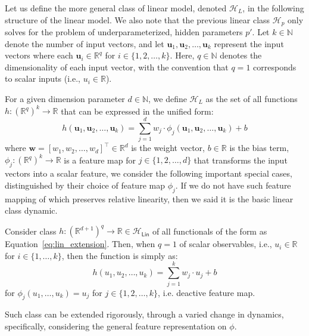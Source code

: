 Let us define the more general class of linear model, denoted $\mathcal{H}_{L}$, in the following structure of the linear model. We also note that the previous linear class $\mathcal{H}_{p}$ only solves for the problem of underparameterized, hidden parameters $p'$. Let $k \in \mathbb{N}$ denote the number of input vectors, and let $\mathbf{u}_1, \mathbf{u}_2, \ldots, \mathbf{u}_k$ represent the input vectors where each $\mathbf{u}_i \in \mathbb{R}^{q}$ for $i \in \{1, 2, \ldots, k\}$. Here, $q \in \mathbb{N}$ denotes the dimensionality of each input vector, with the convention that $q = 1$ corresponds to scalar inputs (i.e., $u_i \in \mathbb{R}$).

For a given dimension parameter $d \in \mathbb{N}$, we define $\mathcal{H}_{L}$ as the set of all functions $h: (\mathbb{R}^{q})^k \to \mathbb{R}$ that can be expressed in the unified form:
\begin{equation}\label{eq:lin_extension}
        h(\mathbf{u}_1, \mathbf{u}_2, \ldots, \mathbf{u}_k) = \sum_{j=1}^{d} w_j \cdot \phi_j(\mathbf{u}_1, \mathbf{u}_2, \ldots, \mathbf{u}_k) + b
    \end{equation}
where $\mathbf{w} = [w_1, w_2, \ldots, w_d]^{\top} \in \mathbb{R}^{d}$ is the weight vector, $b \in \mathbb{R}$ is the bias term, $\phi_j: (\mathbb{R}^{q})^k \to \mathbb{R}$ is a feature map for $j \in \{1, 2, \ldots, d\}$ that transforms the input vectors into a scalar feature, we consider the following important special cases, distinguished by their choice of feature map $\phi_j$. If we do not have such feature mapping of which preserves relative linearity, then we said it is the basic linear class dynamic. 

\begin{definition}[Linear class, $q=1$]
    Consider class $h: (\mathbb{R}^{d+1})^{q}\to \mathbb{R}\in\mathcal{H}_{\mathsf{Lin}}$ of all functionals of the form as Equation~\ref{eq:lin_extension}. Then, when $q=1$ of scalar observables, i.e., $u_i \in \mathbb{R}$ for $i \in \{1, \ldots, k\}$, then the function is simply as:
    \begin{equation}
            h(u_1, u_2, \ldots, u_k) = \sum_{j=1}^{k} w_j \cdot u_j + b
    \end{equation}
    for $\phi_j(u_1, \ldots, u_k) = u_j$ for $j \in \{1, 2, \ldots, k\}$, i.e. deactive feature map. 
\end{definition}
Such class can be extended rigorously, through a varied change in dynamics, specifically, considering the general feature representation on $\phi$. 

